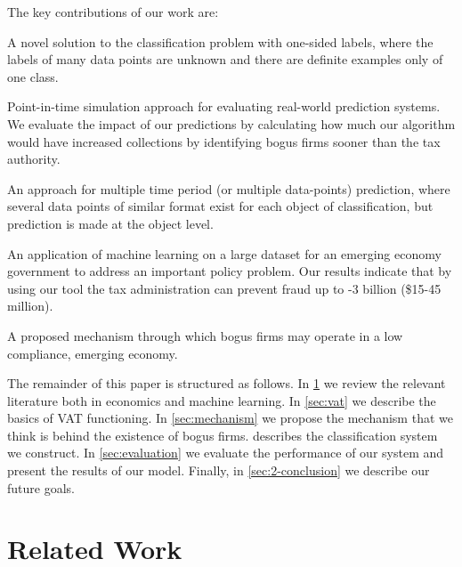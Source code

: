 The key contributions of our work are:
\begin{compactitem}
\item A novel solution to the classification problem with one-sided  labels, where the labels of many data points are unknown and there  are definite examples only of one class.
\item Point-in-time simulation approach for evaluating real-world prediction systems. We evaluate the impact of our predictions by
  calculating how much our algorithm would have increased collections by identifying bogus firms sooner than the tax authority.
\item An approach for multiple time period (or multiple data-points) prediction, where several data points of similar format exist for each object of classification, but prediction is made at the object  level.
\item An application of machine learning on a large dataset for an emerging economy government to address an important policy problem. Our results indicate that by using our tool the tax administration can prevent fraud up to -3 billion (\$15-45 million).
\item A proposed mechanism through which bogus firms may operate in a low compliance, emerging economy.
\end{compactitem}

The remainder of this paper is structured as follows. In \cref{sec:literature} we review the relevant literature both in economics and machine learning. In \cref{sec:vat} we describe the basics of VAT functioning. In \cref{sec:mechanism} we propose the mechanism that we think is behind the existence of bogus firms.  describes the classification system we construct. In \cref{sec:evaluation} we evaluate the performance of our system and present the results of our model. Finally, in \cref{sec:2-conclusion} we describe our future goals.


\section{Related Work}
\label{sec:literature}
